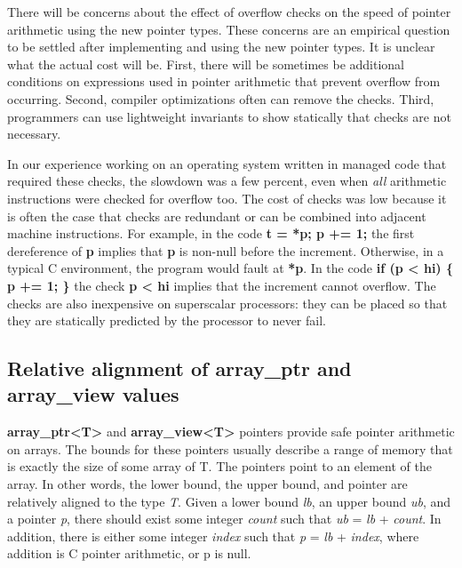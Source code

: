 \documentclass[]{article}
\begin{document}
There will be concerns about the effect of overflow checks on the speed
of pointer arithmetic using the new pointer types. These concerns are an
empirical question to be settled after implementing and using the new
pointer types. It is unclear what the actual cost will be. First, there
will be sometimes be additional conditions on expressions used in
pointer arithmetic that prevent overflow from occurring. Second,
compiler optimizations often can remove the checks. Third, programmers
can use lightweight invariants to show statically that checks are not
necessary.

In our experience working on an operating system written in managed code
that required these checks, the slowdown was a few percent, even when
\emph{all} arithmetic instructions were checked for overflow too. The
cost of checks was low because it is often the case that checks are
redundant or can be combined into adjacent machine instructions. For
example, in the code \textbf{t = *p; p += 1;} the first dereference of
\textbf{p} implies that \textbf{p} is non-null before the increment.
Otherwise, in a typical C environment, the program would fault at
\textbf{*p}. In the code \textbf{if (p \textless{} hi) \{ p += 1; \}}
the check \textbf{p \textless{} hi} implies that the increment cannot
overflow. The checks are also inexpensive on superscalar processors:
they can be placed so that they are statically predicted by the
processor to never fail.

\subsection{\texorpdfstring{\protect\hypertarget{ux5fToc422906955}{}{\protect\hypertarget{ux5fToc424307681}{}{\protect\hypertarget{ux5fToc426641059}{}{\protect\hypertarget{ux5fToc435434919}{}{\protect\hypertarget{ux5fRef436754786}{}{\protect\hypertarget{ux5fToc437460740}{}{\protect\hypertarget{ux5fToc440445421}{}{\protect\hypertarget{ux5fToc440449203}{}{\protect\hypertarget{ux5fToc440551853}{}{}}}}}}}}}Relative
alignment of array\_ptr and array\_view
values}{Relative alignment of array\_ptr and array\_view values}}\label{relative-alignment-of-arrayux5fptr-and-arrayux5fview-values}

\textbf{array\_ptr\textless{}T\textgreater{}} and
\textbf{array\_view\textless{}T\textgreater{}} pointers provide safe
pointer arithmetic on arrays. The bounds for these pointers usually
describe a range of memory that is exactly the size of some array of T.
The pointers point to an element of the array. In other words, the lower
bound, the upper bound, and pointer are relatively aligned to the type
\emph{T}. Given a lower bound \emph{lb}, an upper bound \emph{ub}, and a
pointer \emph{p}, there should exist some integer \emph{count} such that
\emph{ub} = \emph{lb} + \emph{count}. In addition, there is either some
integer \emph{index} such that \emph{p} = \emph{lb} + \emph{index},
where addition is C pointer arithmetic, or p is null.
\end{document}
